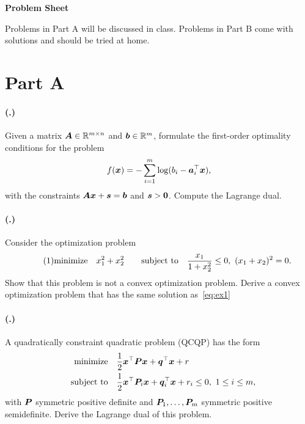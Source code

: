 \documentclass{article}
\newcounter{problemSheetNumber}
\newcounter{problems}
\renewcommand{\problem}{\paragraph{(\theproblemSheetNumber.\theproblems)}\addtocounter{problems}{1}}
\begin{document}
 
\begin{center}
{\Large {\bf Problem Sheet \theproblemSheetNumber}}
\end{center}

Problems in Part A will be discussed in class. Problems in Part B come with solutions and should be tried at home. 


\section*{Part A}
\problem Given a matrix $\bm{A}\in \mathbb{R}^{m\times n}$ and $\bm{b}\in \mathbb{R}^m$, formulate the first-order optimality conditions for the problem 
\begin{equation*}
 f(\bm{x}) = -\sum_{i=1}^m \log(b_i-\bm{a}_i^{\top}\bm{x}),
\end{equation*}
with the constraints $\bm{A}\bm{x}+\bm{s}=\bm{b}$ and $\bm{s}> \bm{0}$. Compute the Lagrange dual.

\problem Consider the optimization problem
 \begin{equation}\label{eq:ex1}\tag{1}
  \minimize x_1^2+x_2^2 \quad \subjto \frac{x_1}{1+x_2^2}\leq 0, \ (x_1+x_2)^2=0.
 \end{equation}
Show that this problem is not a convex optimization problem. Derive a convex optimization problem  that has the same solution as~\eqref{eq:ex1}



\problem A quadratically constraint quadratic problem (QCQP) has the form
\begin{align*}
 \text{minimize}\quad & \frac{1}{2} \bm{x}^{\top}\bm{P}\bm{x}+\bm{q}^{\top}\bm{x}+r\\
 \quad\text{subject to}\quad & \frac{1}{2}\bm{x}^{\top}\bm{P}_i\bm{x}+\bm{q}_i^{\top}\bm{x}+r_i\leq 0, \ 1\leq i\leq m,
\end{align*}
with $\bm{P}$ symmetric positive definite and $\bm{P}_1,\dots,\bm{P}_m$ symmetric positive semidefinite. Derive the Lagrange dual of this problem.

\end{document}

